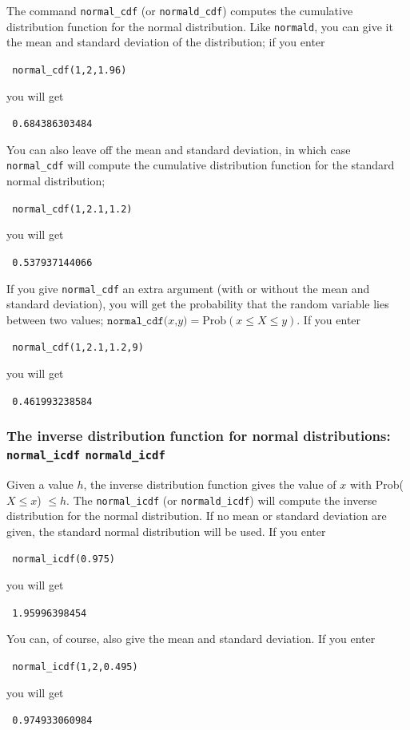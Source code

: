 \documentclass[a4paper,11pt]{book}
\begin{document}
The command \texttt{normal\_cdf} (or \texttt{normald\_cdf}) computes
the cumulative distribution function for the normal distribution.
Like \texttt{normald}, you can give it the mean and standard deviation
of the distribution; if you enter
\begin{center}
  \tt
  normal\_cdf(1,2,1.96)
\end{center}
you will get
\begin{center}
  \tt
  0.684386303484
\end{center}
You can also leave off the mean and standard deviation, in which case
\texttt{normal\_cdf} will compute the cumulative distribution function
for the standard normal distribution;
\begin{center}
  \tt
  normal\_cdf(1,2.1,1.2)
\end{center}
you will get
\begin{center}
  \tt
  0.537937144066
\end{center}

If you give \texttt{normal\_cdf} an extra argument (with or without
the mean and standard deviation), you will get the probability that
the random variable lies between two values;
$\texttt{normal\_cdf($x$,$y$)} = \text{Prob}(x \le X \le y)$.  If you
enter
\begin{center}
  \tt
  normal\_cdf(1,2.1,1.2,9)
\end{center}
you will get
\begin{center}
  \tt
  0.461993238584
\end{center}

\subsubsection{The inverse distribution function for normal
distributions: \texttt{normal\_icdf} \texttt{normald\_icdf}}
Given a value $h$, the inverse distribution function gives
the value of $x$ with Prob($X \le x$) $\le h$.
The \texttt{normal\_icdf} (or \texttt{normald\_icdf}) will compute the
inverse distribution for the normal distribution.  If no
mean or standard deviation are given, the standard normal distribution
will be used.  If you enter
\begin{center}
  \tt
  normal\_icdf(0.975)
\end{center}
you will get
\begin{center}
  \tt
  1.95996398454
\end{center}
You can, of course, also give the mean and standard deviation.  If you
enter
\begin{center}
  \tt
  normal\_icdf(1,2,0.495)
\end{center}
you will get
\begin{center}
  \tt
  0.974933060984
\end{center}
\end{document}
